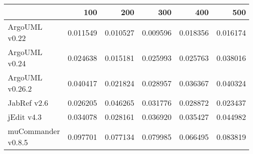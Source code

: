 \begin{tabular}{lrrrrr}
\toprule
{} &       100 &       200 &       300 &       400 &       500 \\
\midrule
ArgoUML v0.22      &  0.011549 &  0.010527 &  0.009596 &  0.018356 &  0.016174 \\
ArgoUML v0.24      &  0.024638 &  0.015181 &  0.025993 &  0.025763 &  0.038016 \\
ArgoUML v0.26.2    &  0.040417 &  0.021824 &  0.028957 &  0.036367 &  0.040324 \\
JabRef v2.6        &  0.026205 &  0.046265 &  0.031776 &  0.028872 &  0.023437 \\
jEdit v4.3         &  0.034078 &  0.028161 &  0.036920 &  0.035427 &  0.044982 \\
muCommander v0.8.5 &  0.097701 &  0.077134 &  0.079985 &  0.066495 &  0.083819 \\
\bottomrule
\end{tabular}
